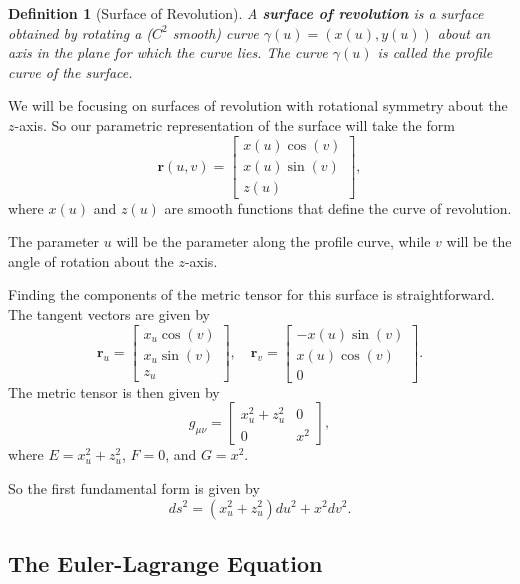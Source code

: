 \documentclass[12pt]{article}
\newtheorem{definition}{Definition}[section]
\begin{document}
\begin{definition}[Surface of Revolution]
A \textbf{surface of revolution} is a surface obtained by rotating a ($C^{2}$ smooth) curve \(\gamma(u) = (x(u), y(u))\) about an axis in the plane for which the curve lies.
The curve \(\gamma(u)\) is called the profile curve of the surface.
\end{definition}

We will be focusing on surfaces of revolution with rotational symmetry about the \(z\)-axis.
So our parametric representation of the surface will take the form
\begin{equation} \label{eq:surface_of_revolution}
    \mathbf{r}(u, v) = \begin{bmatrix} x(u) \cos (v) \\ x(u) \sin (v) \\ z(u) \end{bmatrix},
\end{equation}
where \(x(u)\) and \(z(u)\) are smooth functions that define the curve of revolution.

The parameter \(u\) will be the parameter along the profile curve, while \(v\) will be the angle of rotation about the \(z\)-axis.

Finding the components of the metric tensor for this surface is straightforward.
The tangent vectors are given by
\[
    \mathbf{r}_u = \begin{bmatrix} x_u \cos (v) \\ x_u \sin (v) \\ z_u \end{bmatrix}, \quad \mathbf{r}_v = \begin{bmatrix} -x(u) \sin (v) \\ x(u) \cos (v) \\ 0 \end{bmatrix}.
\]
The metric tensor is then given by
\[
    g_{\mu\nu} = \begin{bmatrix} x_{u}^2 + z_u^2 & 0 \\ 0 & x^2 \end{bmatrix},
\]
where \(E = x_{u}^2 + z_u^2\), \(F = 0\), and \(G = x^2\).

So the first fundamental form is given by
\begin{equation}
    ds^2 = \left( x_{u}^2 + z_u^2 \right) du^2 + x^2 dv^2.
\end{equation}

\subsection{The Euler-Lagrange Equation}
\end{document}
